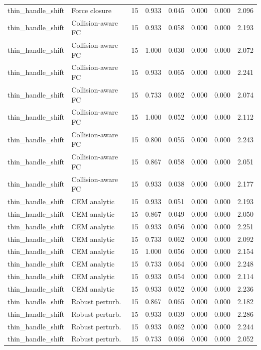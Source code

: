 {\begin{longtable}{llrrrrrr}
thin\_handle\_shift & Force closure & 15 & 0.933 & 0.045 & 0.000 & 0.000 & 2.096 \\
thin\_handle\_shift & Collision-aware FC & 15 & 0.933 & 0.058 & 0.000 & 0.000 & 2.193 \\
thin\_handle\_shift & Collision-aware FC & 15 & 1.000 & 0.030 & 0.000 & 0.000 & 2.072 \\
thin\_handle\_shift & Collision-aware FC & 15 & 0.933 & 0.065 & 0.000 & 0.000 & 2.241 \\
thin\_handle\_shift & Collision-aware FC & 15 & 0.733 & 0.062 & 0.000 & 0.000 & 2.074 \\
thin\_handle\_shift & Collision-aware FC & 15 & 1.000 & 0.052 & 0.000 & 0.000 & 2.112 \\
thin\_handle\_shift & Collision-aware FC & 15 & 0.800 & 0.055 & 0.000 & 0.000 & 2.243 \\
thin\_handle\_shift & Collision-aware FC & 15 & 0.867 & 0.058 & 0.000 & 0.000 & 2.051 \\
thin\_handle\_shift & Collision-aware FC & 15 & 0.933 & 0.038 & 0.000 & 0.000 & 2.177 \\
thin\_handle\_shift & CEM analytic & 15 & 0.933 & 0.051 & 0.000 & 0.000 & 2.193 \\
thin\_handle\_shift & CEM analytic & 15 & 0.867 & 0.049 & 0.000 & 0.000 & 2.050 \\
thin\_handle\_shift & CEM analytic & 15 & 0.933 & 0.056 & 0.000 & 0.000 & 2.251 \\
thin\_handle\_shift & CEM analytic & 15 & 0.733 & 0.062 & 0.000 & 0.000 & 2.092 \\
thin\_handle\_shift & CEM analytic & 15 & 1.000 & 0.056 & 0.000 & 0.000 & 2.154 \\
thin\_handle\_shift & CEM analytic & 15 & 0.733 & 0.064 & 0.000 & 0.000 & 2.248 \\
thin\_handle\_shift & CEM analytic & 15 & 0.933 & 0.054 & 0.000 & 0.000 & 2.114 \\
thin\_handle\_shift & CEM analytic & 15 & 0.933 & 0.052 & 0.000 & 0.000 & 2.236 \\
thin\_handle\_shift & Robust perturb. & 15 & 0.867 & 0.065 & 0.000 & 0.000 & 2.182 \\
thin\_handle\_shift & Robust perturb. & 15 & 0.933 & 0.039 & 0.000 & 0.000 & 2.286 \\
thin\_handle\_shift & Robust perturb. & 15 & 0.933 & 0.062 & 0.000 & 0.000 & 2.244 \\
thin\_handle\_shift & Robust perturb. & 15 & 0.733 & 0.066 & 0.000 & 0.000 & 2.052 \\

\end{longtable}}

